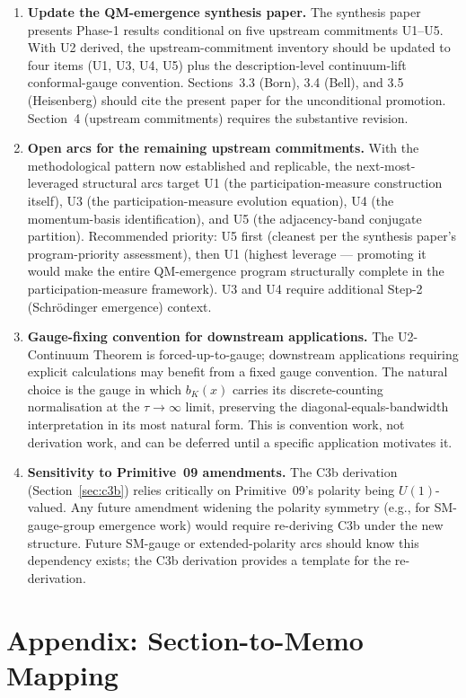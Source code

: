 \documentclass[11pt,a4paper]{article}
\begin{document}
\begin{enumerate}
  \item \textbf{Update the QM-emergence synthesis paper.} The synthesis paper~\cite{phase1} presents Phase-1 results conditional on five upstream commitments U1--U5. With U2 derived, the upstream-commitment inventory should be updated to four items (U1, U3, U4, U5) plus the description-level continuum-lift conformal-gauge convention. Sections~3.3 (Born), 3.4 (Bell), and 3.5 (Heisenberg) should cite the present paper for the unconditional promotion. Section~4 (upstream commitments) requires the substantive revision.
  \item \textbf{Open arcs for the remaining upstream commitments.} With the methodological pattern now established and replicable, the next-most-leveraged structural arcs target U1 (the participation-measure construction itself), U3 (the participation-measure evolution equation), U4 (the momentum-basis identification), and U5 (the adjacency-band conjugate partition). Recommended priority: U5 first (cleanest per the synthesis paper's program-priority assessment), then U1 (highest leverage --- promoting it would make the entire QM-emergence program structurally complete in the participation-measure framework). U3 and U4 require additional Step-2 (Schr\"odinger emergence) context.
  \item \textbf{Gauge-fixing convention for downstream applications.} The U2-Continuum Theorem is forced-up-to-gauge; downstream applications requiring explicit calculations may benefit from a fixed gauge convention. The natural choice is the gauge in which $b_K(x)$ carries its discrete-counting normalisation at the $\tau \to \infty$ limit, preserving the diagonal-equals-bandwidth interpretation in its most natural form. This is convention work, not derivation work, and can be deferred until a specific application motivates it.
  \item \textbf{Sensitivity to Primitive~09 amendments.} The C3b derivation (Section~\ref{sec:c3b}) relies critically on Primitive~09's polarity being $U(1)$-valued. Any future amendment widening the polarity symmetry (e.g., for SM-gauge-group emergence work) would require re-deriving C3b under the new structure. Future SM-gauge or extended-polarity arcs should know this dependency exists; the C3b derivation provides a template for the re-derivation.
\end{enumerate}

\section*{Appendix: Section-to-Memo Mapping}\label{sec:appendix}
\end{document}
